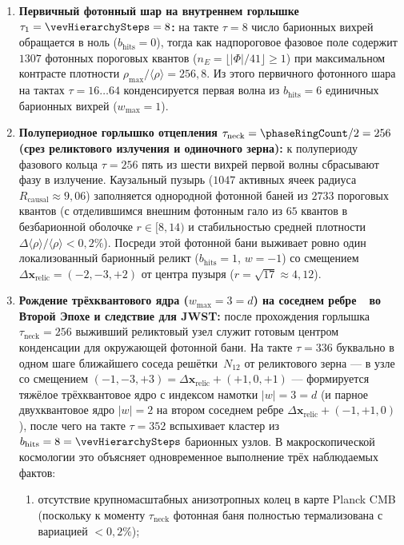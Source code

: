 \begin{enumerate}[leftmargin=*]
\item \textbf{Первичный фотонный шар на внутреннем горлышке $\tau_1 = \vevHierarchySteps = 8$:}
  на такте $\tau = 8$ число барионных вихрей обращается в ноль ($b_{\mathrm{hits}} = 0$), тогда как надпороговое фазовое поле содержит $1307$ фотонных пороговых квантов ($n_E = \lfloor|\Phi|/41\rfloor \ge 1$) при максимальном контрасте плотности $\rho_{\max}/\langle\rho\rangle = 256{,}8$. Из этого первичного фотонного шара на тактах $\tau = 16\ldots 64$ конденсируется первая волна из $b_{\mathrm{hits}} = 6$ единичных барионных вихрей ($w_{\max} = 1$).
\item \textbf{Полупериодное горлышко отцепления $\tau_{\mathrm{neck}} = \phaseRingCount/2 = 256$ (срез реликтового излучения и одиночного зерна):}
  к полупериоду фазового кольца $\tau = 256$ пять из шести вихрей первой волны сбрасывают фазу в излучение. Каузальный пузырь ($1047$ активных ячеек радиуса $R_{\mathrm{causal}} \approx 9{,}06$) заполняется однородной фотонной баней из $2733$ пороговых квантов (с отделившимся внешним фотонным гало из $65$ квантов в безбарионной оболочке $r \in [8, 14)$ и стабильностью средней плотности $\Delta\langle\rho\rangle/\langle\rho\rangle < 0{,}2\%$). Посреди этой фотонной бани выживает ровно один локализованный барионный реликт ($b_{\mathrm{hits}} = 1$, $w = -1$) со смещением $\Delta\mathbf{x}_{\mathrm{relic}} = (-2, -3, +2)$ от центра пузыря ($r = \sqrt{17} \approx 4{,}12$).
\item \textbf{Рождение трёхквантового ядра ($w_{\max} = 3 = d$) на соседнем ребре~\latGCKshort\ во Второй Эпохе и следствие для JWST:}
  после прохождения горлышка $\tau_{\mathrm{neck}} = 256$ выживший реликтовый узел служит готовым центром конденсации для окружающей фотонной бани. На такте $\tau = 336$ буквально в одном шаге ближайшего соседа решётки~$N_{12}$ от реликтового зерна — в узле со смещением $(-1, -3, +3) = \Delta\mathbf{x}_{\mathrm{relic}} + (+1, 0, +1)$ — формируется тяжёлое трёхквантовое ядро с индексом намотки $|w| = 3 = d$ (и парное двухквантовое ядро $|w| = 2$ на втором соседнем ребре $\Delta\mathbf{x}_{\mathrm{relic}} + (-1, +1, 0)$), после чего на такте $\tau = 352$ вспыхивает кластер из $b_{\mathrm{hits}} = 8 = \vevHierarchySteps$ барионных узлов.
  В макроскопической космологии это объясняет одновременное выполнение трёх наблюдаемых фактов:
  \begin{enumerate}[label=(\alph*),noitemsep]
  \item отсутствие крупномасштабных анизотропных колец в карте Planck CMB (поскольку к моменту $\tau_{\mathrm{neck}}$ фотонная баня полностью термализована с вариацией $< 0{,}2\%$);

\end{enumerate}
\end{enumerate}

